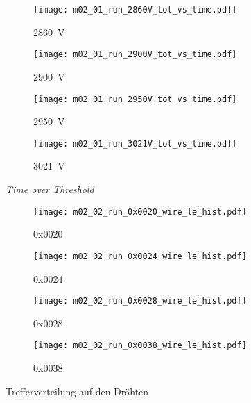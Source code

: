 \documentclass[11pt, ngerman, fleqn, DIV=15, headinclude, BCOR=2cm]{scrreprt}
\begin{document}
\begin{appendix}
	\begin{figure}
		\centering
	\begin{subfigure}[a]{0.45 \textwidth}
		\texttt{[image: m02\_01\_run\_2860V\_tot\_vs\_time.pdf]}
		\caption{%
			\SI{2860}{\volt}
		}
		\label{fig:m02_01_run_2860V_tot_vs_time}
	\end{subfigure}
	\begin{subfigure}[a]{0.45 \textwidth}
		\texttt{[image: m02\_01\_run\_2900V\_tot\_vs\_time.pdf]}
		\caption{%
			\SI{2900}{\volt}
		}
		\label{fig:m02_01_run_2900V_tot_vs_time}
	\end{subfigure}
	\begin{subfigure}[a]{0.45 \textwidth}
		\texttt{[image: m02\_01\_run\_2950V\_tot\_vs\_time.pdf]}
		\caption{%
			\SI{2950}{\volt}
		}
		\label{fig:m02_01_run_2950V_tot_vs_time}
	\end{subfigure}
	\begin{subfigure}[a]{0.45 \textwidth}
		\texttt{[image: m02\_01\_run\_3021V\_tot\_vs\_time.pdf]}
		\caption{%
			\SI{3021}{\volt}
		}
		\label{fig:m02_01_run_3021V_tot_vs_time}
	\end{subfigure}
	\caption{%
		\emph{Time over Threshold}
	}
	\label{fig:m02_01_tot_vs_time}
	\end{figure}

	\clearpage



	\begin{figure}
		\centering
	\begin{subfigure}[a]{0.45 \textwidth}
		\texttt{[image: m02\_02\_run\_0x0020\_wire\_le\_hist.pdf]}
		\caption{%
			0x0020
		}
		\label{fig:m02_02_run_0x0020_wire_le_hist}
	\end{subfigure}
	\begin{subfigure}[a]{0.45 \textwidth}
		\texttt{[image: m02\_02\_run\_0x0024\_wire\_le\_hist.pdf]}
		\caption{%
			0x0024
		}
		\label{fig:m02_02_run_0x0024_wire_le_hist}
	\end{subfigure}
	\begin{subfigure}[a]{0.45 \textwidth}
		\texttt{[image: m02\_02\_run\_0x0028\_wire\_le\_hist.pdf]}
		\caption{%
			0x0028
		}
		\label{fig:m02_02_run_0x0028_wire_le_hist}
	\end{subfigure}
	\begin{subfigure}[a]{0.45 \textwidth}
		\texttt{[image: m02\_02\_run\_0x0038\_wire\_le\_hist.pdf]}
		\caption{%
			0x0038
		}
		\label{fig:m02_02_run_0x0038_wire_le_hist}
	\end{subfigure}
	\caption{%
		Trefferverteilung auf den Drähten
	}
	\label{fig:m02_02_wire_le_hist}
	\end{figure}


\end{appendix}
\end{document}
